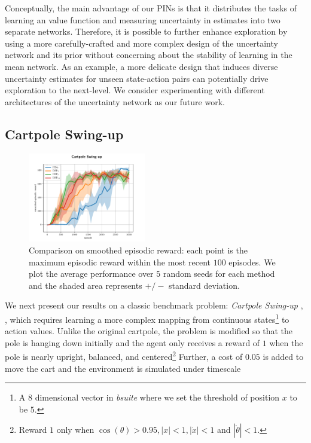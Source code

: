 \documentclass[letterpaper]{article} %
\newcommand{\abs}[1]{\left|#1\right|}
\theoremstyle{definition}
\begin{document}
Conceptually, the main advantage of our PINs is that it distributes the tasks of learning an value function and measuring uncertainty in estimates into two separate networks. Therefore, it is possible to further enhance exploration by using a more carefully-crafted and more complex design of the uncertainty network and its prior without concerning about the stability of learning in the mean network. As an example, a more delicate design that induces diverse uncertainty estimates for unseen state-action pairs can potentially drive exploration to the next-level. We consider experimenting with different architectures of the uncertainty network as our future work.

\vspace{-1.58mm}
\subsection{Cartpole Swing-up}
\vspace{-7.63mm}
\begin{figure}[ht]
\centering
\includegraphics[width=0.8\linewidth,height=1.54in ]{cartpole_std_plot.pdf}
\caption{Comparison on smoothed episodic reward: each point is the maximum episodic reward within the most recent $100$ episodes. We plot the average performance over $5$ random seeds for each method and the shaded area represents $+/-$ standard deviation.}
\label{fig:cartpole_per}
\end{figure}

We next present our results on a classic benchmark problem: \textit{Cartpole Swing-up} \cite{sutton2018reinforcement}, \cite{osband2019bsuite}, which requires learning a more complex mapping from continuous states\footnote{A $8$ dimensional vector in \textit{bsuite} where we set the threshold of position $x$ to be $5$.} to action values. Unlike the original cartpole, the problem is modified so that the pole is hanging down initially and the agent only receives a reward of $1$ when the pole is nearly upright, balanced, and centered\footnote{Reward $1$ only when $\cos(\theta) > 0.95, \abs{x} < 1, \abs{\Dot{x}} < 1$ and $|\Dot{\theta}| < 1$.} Further, a cost of $0.05$ is added to move the cart and the environment is simulated under timescale
\end{document}
